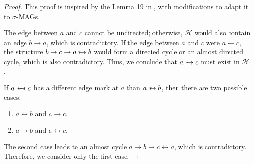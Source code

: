 \documentclass[accepted]{uai2025} %
\newcommand{\huh}{\mathrel{\leftrightarrow}}
\newcommand{\suh}{\mathrel{{\ast\mkern-11mu\to}}}
\newcommand{\sus}{\mathrel{{\ast\mkern-11mu\relbar\mkern-9mu\relbar\mkern-11mu\ast}}}
\begin{document}
\lemmanineteen*
\begin{proof}
This proof is inspired by the Lemma 19 in \citep{spirtes1996polynomial}, with modifications to adapt it to \( \sigma \)-MAGs.

The edge between \( a \) and \( c \) cannot be undirected; otherwise, \( \mathcal{H} \) would also contain an edge \( b \rightarrow a \), which is contradictory. If the edge between \( a \) and \( c \) were \( a \leftarrow c \), the structure \( b \rightarrow c \rightarrow a \suh b \) would form a directed cycle or an almost directed cycle, which is also contradictory. Thus, we conclude that \( a \suh c \) must exist in \( \mathcal{H} \).  

If \( a \sus  c \) has a different edge mark at \( a \) than \( a \suh b \), then there are two possible cases:  
\begin{enumerate}  
    \item \( a \huh  b \) and \( a \rightarrow c \),  
    \item \( a \rightarrow b \) and \( a \huh  c \).  
\end{enumerate}  
The second case leads to an almost cycle \( a \rightarrow b \rightarrow c \huh  a \), which is contradictory. Therefore, we consider only the first case.
\end{proof}


\end{document}
